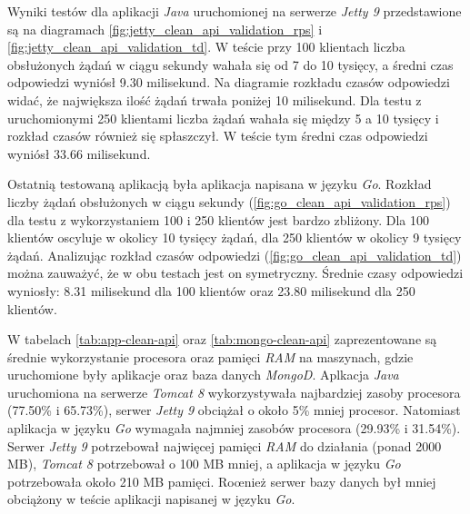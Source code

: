 Wyniki testów dla aplikacji \textsl{Java} uruchomionej na serwerze \textsl{Jetty 9} przedstawione są na diagramach \ref{fig:jetty_clean_api_validation_rps} i \ref{fig:jetty_clean_api_validation_td}. W teście przy 100 klientach liczba obsłużonych żądań w ciągu sekundy wahała się od 7 do 10 tysięcy, a średni czas odpowiedzi wyniósł 9.30 milisekund. Na diagramie rozkładu czasów odpowiedzi widać, że największa ilość żądań trwała poniżej 10 milisekund. Dla testu z uruchomionymi 250 klientami liczba żądań wahała się między 5 a 10 tysięcy i rozkład czasów również się spłaszczył. W teście tym średni czas odpowiedzi wyniósł 33.66 milisekund. 

Ostatnią testowaną aplikacją była aplikacja napisana w języku \textsl{Go}. Rozkład liczby żądań obsłużonych w ciągu sekundy (\ref{fig:go_clean_api_validation_rps}) dla testu z wykorzystaniem 100 i 250 klientów jest bardzo zbliżony. Dla 100 klientów oscyluje w okolicy 10 tysięcy żądań, dla 250 klientów w okolicy 9 tysięcy żądań. Analizując rozkład czasów odpowiedzi (\ref{fig:go_clean_api_validation_td}) można zauważyć, że w obu testach jest on symetryczny. Średnie czasy odpowiedzi wyniosły: 8.31 milisekund dla 100 klientów oraz 23.80 milisekund dla 250 klientów.

W tabelach \ref{tab:app-clean-api} oraz \ref{tab:mongo-clean-api} zaprezentowane są średnie wykorzystanie procesora oraz pamięci \textsl{RAM} na maszynach, gdzie uruchomione były aplikacje oraz baza danych \textsl{MongoD}. Aplkacja \textsl{Java} uruchomiona na serwerze \textsl{Tomcat 8} wykorzystywała najbardziej zasoby procesora (77.50\% i 65.73\%), serwer \textsl{Jetty 9} obciążał o około 5\% mniej procesor. Natomiast aplikacja w języku \textsl{Go} wymagała najmniej zasobów procesora (29.93\% i 31.54\%). Serwer \textsl{Jetty 9} potrzebował najwięcej pamięci \textsl{RAM} do działania (ponad 2000 MB), \textsl{Tomcat 8} potrzebował o 100 MB mniej, a aplikacja w języku \textsl{Go} potrzebowała około 210 MB pamięci. Roœnież serwer bazy danych był mniej obciążony w teście aplikacji napisanej w języku \textsl{Go}.



\clearpage

